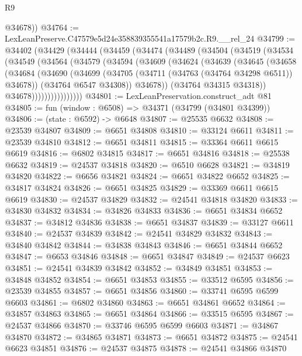 \begin{lexlean}{R9}
\begin{coremodule}
        @34678))
@34764 := LexLeanPreserve.C47579e5d24e358839355541a17579b2c.R9.__rel_24
@34799 := @34402
    (@34429
      (@34444
        (@34459
          (@34474
            (@34489
              (@34504
                (@34519
                  (@34534
                    (@34549
                      (@34564
                        (@34579
                          (@34594
                            (@34609
                              (@34624
                                (@34639
                                  (@34645
                                    (@34658
                                      (@34684
                                        (@34690
                                          (@34699
                                            (@34705 (@34711 (@34763 (@34764 @34298 @6511)) @34678))
                                            (@34764 @6547 @34308))
                                          @34678))
                                      (@34764 @34315 @34318))
                                    @34678))))))))))))))))
@34801 := LexLeanPreservation.construct_adt @81
@34805 := fun (window : @6508) => @34371 (@34799 (@34801 @34399))
@34806 := (state : @6592) -> @6648
@34807 := @25535 @6632
@34808 := @23539 @34807
@34809 := @6651 @34808
@34810 := @33124 @6611
@34811 := @23539 @34810
@34812 := @6651 @34811
@34815 := @33364 @6611 @6615 @6619
@34816 := @6802 @34815
@34817 := @6651 @34816
@34818 := @25538 @6632
@34819 := @24537 @34818
@34820 := @6510 @6628
@34821 := @34819 @34820
@34822 := @6656 @34821
@34824 := @6651 @34822 @6652
@34825 := @34817 @34824
@34826 := @6651 @34825
@34829 := @33369 @6611 @6615 @6619
@34830 := @24537 @34829
@34832 := @24541 @34818 @34820
@34833 := @34830 @34832
@34834 := @34826 @34833
@34836 := @6651 @34834 @6652
@34837 := @34812 @34836
@34838 := @6651 @34837
@34839 := @33127 @6611
@34840 := @24537 @34839
@34842 := @24541 @34829 @34832
@34843 := @34840 @34842
@34844 := @34838 @34843
@34846 := @6651 @34844 @6652
@34847 := @6653 @34846
@34848 := @6651 @34847
@34849 := @24537 @6623
@34851 := @24541 @34839 @34842
@34852 := @34849 @34851
@34853 := @34848 @34852
@34854 := @6651 @34853
@34855 := @33512 @6595
@34856 := @23539 @34855
@34857 := @6651 @34856
@34860 := @33741 @6595 @6599 @6603
@34861 := @6802 @34860
@34863 := @6651 @34861 @6652
@34864 := @34857 @34863
@34865 := @6651 @34864
@34866 := @33515 @6595
@34867 := @24537 @34866
@34870 := @33746 @6595 @6599 @6603
@34871 := @34867 @34870
@34872 := @34865 @34871
@34873 := @6651 @34872
@34875 := @24541 @6623 @34851
@34876 := @24537 @34875
@34878 := @24541 @34866 @34870

\end{coremodule}
\end{lexlean}
